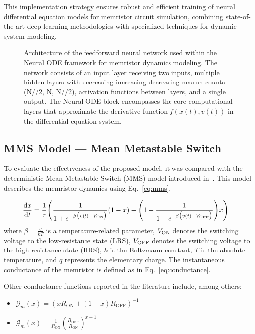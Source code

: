 \documentclass[11pt, oneside]{article}
\newcommand{\G}{\mathcal{G}}
\newcommand{\von}{V_{\rm ON}}
\newcommand{\voff}{V_{\rm OFF}}
\newcommand{\ua}{v}
\newcommand{\xw}{x}
\newcommand{\dert}[1]{\frac{{\rm d} {#1}}{{\rm d} t} }
\begin{document}
This  implementation strategy ensures robust and efficient training of neural differential equation models for memristor circuit simulation, combining state-of-the-art deep learning methodologies with specialized techniques for dynamic system modeling.


\begin{figure}[H]
    \centering
    \resizebox{\linewidth}{!}{%
        
    }
    \caption{Architecture of the feedforward neural network used within the Neural ODE framework for memristor dynamics modeling. The network consists of an input layer receiving two inputs, multiple hidden layers with decreasing-increasing-decreasing neuron counts (N//2, N, N//2), activation functions between layers, and a single output. The Neural ODE block encompasses the core computational layers that approximate the derivative function $f(\xw(t), \ua(t))$ in the differential equation system.}

    \label{fig:nn-arch}
\end{figure}


\subsection{MMS Model — Mean Metastable Switch}

To evaluate the effectiveness of the proposed model, it was compared with the deterministic Mean Metastable Switch (MMS) model introduced in~\cite{Molter2016, Ostrovskii2021}. This model describes the memristor dynamics using Eq.~\eqref{eq:mms}.


\begin{align}
    \label{eq:mms}
    \dert{x} & =  \frac{1}{\tau} \Bigg( \frac{1}{1+e^{-\beta \big(\ua(t)-\von\big)}} (1-x)  -\Bigg(1- \frac{1}{1+e^{-\beta \big(\ua(t)-\voff\big)}} \Bigg) x \Bigg)
\end{align}
where $\beta= \frac{q}{kT}$ is a temperature-related parameter, $\von$ denotes the switching voltage to the low-resistance state (LRS), $\voff$ denotes the switching voltage to the high-resistance state (HRS), $k$ is the Boltzmann constant, $T$ is the absolute temperature, and $q$ represents the elementary charge. The instantaneous conductance of the memristor is defined as in Eq.~\eqref{eq:conductance}.

Other conductance functions reported in the literature include, among others:
\begin{itemize}
    \item $\G_m(x) = \left( x R_{\mathrm{ON}} + (1 - x) R_{\mathrm{OFF}} \right)^{-1}$
    \item $\G_m(x) = \frac{1}{R_{\mathrm{ON}}} \left( \frac{R_{\mathrm{OFF}}}{R_{\mathrm{ON}}} \right)^{x-1}$
\end{itemize}
\end{document}
